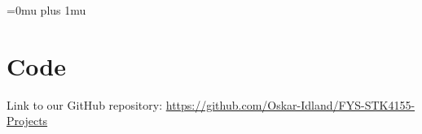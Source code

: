 \documentclass[aps,pra,english,notitlepage,reprint,nofootinbib]{revtex4-1}  %
\begin{document}
\Urlmuskip=0mu plus 1mu\relax
\onecolumngrid


\newpage
\appendix
\section{Code}\label{appsec:code}
Link to our GitHub repository: \href{https://github.com/Oskar-Idland/FYS-STK4155-Projects}{https://github.com/Oskar-Idland/FYS-STK4155-Projects}

\end{document}
